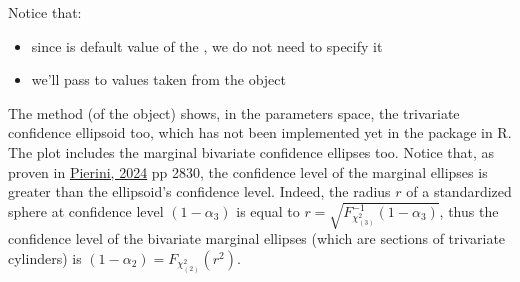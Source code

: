 \documentclass[letterpaper,10pt,english]{sphinxmanual}
\begin{document}
\sphinxAtStartPar
Notice that:
\begin{itemize}
\item {} 
\sphinxAtStartPar
since  is default value of the  , we do not need to specify it

\item {} 
\sphinxAtStartPar
we’ll pass to   values taken from the object 

\end{itemize}
\label{\detokenize{manual:confidence-ellipsoid}}
\sphinxAtStartPar
The method  (of the  object)
shows, in the parameters space, the trivariate confidence ellipsoid too, which has not
been implemented yet in the  package in R.
The plot includes the marginal bivariate confidence ellipses too. Notice that, as proven in
\hyperlink{cite.references:id41}{Pierini, 2024} pp 28\sphinxhyphen{}30, the confidence level of the marginal ellipses is greater
than the ellipsoid’s confidence level. Indeed, the radius \(r\) of a
standardized sphere at confidence
level \((1-\alpha_3)\) is equal to \(r = \sqrt{ F^{-1}_{\chi^2_{(3)}}(1-\alpha_3) }\), thus
the confidence level of the bivariate marginal ellipses (which are sections of trivariate
cylinders) is \((1-\alpha_2) = F_{\chi^2_{(2)}}(r^2)\).
\def\sphinxLiteralBlockLabel{\label{\detokenize{manual:id52}}}
\begin{sphinxVerbatim}[commandchars=\\\{\},numbers=left,firstnumber=1,stepnumber=1]
  
     
         \PYG{p}{[}\PYG{p}{]}
         \PYG{p}{[}\PYG{p}{]}
         \PYG{p}{[}\PYG{p}{]}
\end{sphinxVerbatim}
\end{document}

